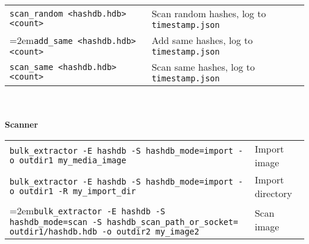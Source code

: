 \begin{footnotesize}
\begin{tabular}{p{3.6 in} p{4 in}}
\texttt{scan\_random <hashdb.hdb> <count>} & Scan random hashes, log to \texttt{timestamp.json}\\
\hangindent=2em\texttt{add\_same <hashdb.hdb> <count>} & Add same hashes, log to \texttt{timestamp.json}\\
\texttt{scan\_same <hashdb.hdb> <count>} & Scan same hashes, log to \texttt{timestamp.json}\\
\end{tabular}
\\
\\
\textbf{\bulk Scanner}\\
\begin{tabular}{p{5.6 in} p{2 in}}
\texttt{bulk\_extractor -E hashdb -S hashdb\_mode=import -o outdir1 my\_media\_image} & Import image\\
\texttt{bulk\_extractor -E hashdb -S hashdb\_mode=import -o outdir1 -R my\_import\_dir} & Import directory\\
\hangindent=2em\texttt{bulk\_extractor -E hashdb -S hashdb\_mode=scan -S hashdb\_scan\_path\_or\_socket= outdir1/hashdb.hdb -o outdir2 my\_image2} & Scan image\\
\end{tabular}
\end{footnotesize}

